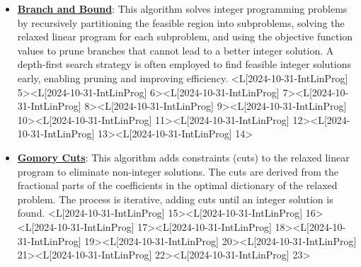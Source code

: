 \documentclass{article}%
\begin{document}
\begin{itemize}[[leftmargin=*]]%
\item \href{https://www.math.purdue.edu/~yipn/421/2024-10-31-IntLinProg.pdf#page=5}{\textbf{Branch and Bound}}: This algorithm solves integer programming problems by recursively partitioning the feasible region into subproblems, solving the relaxed linear program for each subproblem, and using the objective function values to prune branches that cannot lead to a better integer solution. A depth-first search strategy is often employed to find feasible integer solutions early, enabling pruning and improving efficiency. <L[2024-10-31-IntLinProg] 5><L[2024-10-31-IntLinProg] 6><L[2024-10-31-IntLinProg] 7><L[2024-10-31-IntLinProg] 8><L[2024-10-31-IntLinProg] 9><L[2024-10-31-IntLinProg] 10><L[2024-10-31-IntLinProg] 11><L[2024-10-31-IntLinProg] 12><L[2024-10-31-IntLinProg] 13><L[2024-10-31-IntLinProg] 14>%
\item \href{https://www.math.purdue.edu/~yipn/421/2024-10-31-IntLinProg.pdf#page=15}{\textbf{Gomory Cuts}}: This algorithm adds constraints (cuts) to the relaxed linear program to eliminate non-integer solutions. The cuts are derived from the fractional parts of the coefficients in the optimal dictionary of the relaxed problem. The process is iterative, adding cuts until an integer solution is found. <L[2024-10-31-IntLinProg] 15><L[2024-10-31-IntLinProg] 16><L[2024-10-31-IntLinProg] 17><L[2024-10-31-IntLinProg] 18><L[2024-10-31-IntLinProg] 19><L[2024-10-31-IntLinProg] 20><L[2024-10-31-IntLinProg] 21><L[2024-10-31-IntLinProg] 22><L[2024-10-31-IntLinProg] 23>%
\end{itemize}%
\end{document}
